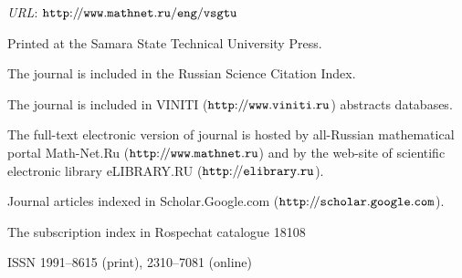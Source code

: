 

\par \noindent \textit{URL}\/: \mbox{\href{http://www.mathnet.ru/eng/vsgtu}{$\tt http{:}{/\!/}www.mathnet.ru{/}eng{/}vsgtu$}}





\bigskip 

\par \noindent 

Printed at the Samara State Technical University Press.





\fontsize{9pt}{8pt}\selectfont



\bigskip

\par \noindent 

The journal is included in the Russian Science Citation Index.

\smallskip

\par \noindent 

The journal is included in VINITI (\href{http://www.viniti.ru}{$\tt http{:}{/\!/}www.viniti.ru$}) abstracts databases.

\smallskip

\par \noindent 

The full-text electronic version of journal is hosted by all-Russian mathematical portal Math-Net.Ru (\href{http://www.mathnet.ru}{$\tt http{:}{/\!/}www.mathnet.ru$}) and by the web-site of scientific electronic library eLIBRARY.RU (\href{http://elibrary.ru/title_about.asp?id=5784}{$\tt http{:}{/\!/}elibrary.ru$}). 

\smallskip

\par \noindent Journal articles indexed in Scholar.Google.com (\href{http://scholar.google.com/scholar?q=Vestn.+Samar.+Gos.+Tekhn.+Univ.+Ser.+Fiz.-Mat.+Nauki}{$\tt http{:}{/\!/}scholar.google.com$}).



\smallskip



{\bf 

\par \noindent 

The subscription index in Rospechat catalogue 18108

\smallskip

\par \noindent 

ISSN 1991--8615 (print), 2310--7081 (online)  }



